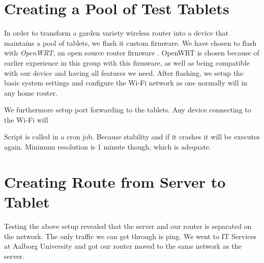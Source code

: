 \section{Creating a Pool of Test Tablets}
In order to transform a garden variety wireless router into a device that maintains a pool of tablets, we flash it custom firmware. We have chosen to flash with \emph{OpenWRT}, an open source router firmware . OpenWRT is chosen because of earlier experience in this group with this firmware, as well as being compatible with our device and having all features we need. After flashing, we setup the basic system settings and configure the Wi-Fi network as one normally will in any home router.

We furthermore setup port forwarding to the tablets. Any device connecting to the Wi-Fi will 

Script is called in a cron job. Because stability and if it crashes it will be executes again. Minimum resolution is 1 minute though, which is adequate. 


\section{Creating Route from Server to Tablet}
Testing the above setup revealed that the server and our router is separated on the network. The only traffic we can get through is ping. We went to IT Services at Aalborg University and got our router moved to the same network as the server. 

